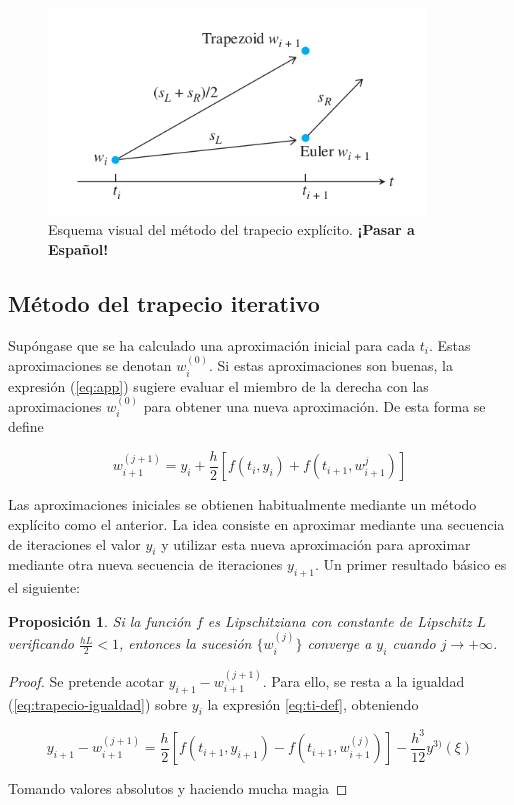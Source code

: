 \documentclass{article}
\theoremstyle{theorem-style}  %
\newtheorem{proposition}[theorem]{Proposición}
\theoremstyle{definition}
\theoremstyle{example-style}
\begin{document}
		\begin{figure}[H]
			\centering
			\includegraphics[width=10cm]{./Images/trapecio-vs-euler.png}
			\caption{Esquema visual del método del trapecio explícito. \textbf{¡Pasar a Español!}} 
			\label{fig:trapecio-vs-euler}
		\end{figure}

	\subsection{Método del trapecio iterativo}
	
		Supóngase que se ha calculado una aproximación inicial para cada $t_i$. Estas aproximaciones se denotan $w_i^{(0)}$. Si estas aproximaciones son buenas, la expresión (\ref{eq:app}) sugiere evaluar el miembro de la derecha con las aproximaciones $w_i^{(0)}$ para obtener una nueva aproximación. De esta forma se define
		
		\begin{equation} \label{eq:ti-def}
			w_{i+1} ^{(j+1)} = y_i + \frac{h}{2} \left[f(t_i, y_i) + f(t_{i+1}, w_{i+1}^{j})\right]
		\end{equation}

		Las aproximaciones iniciales se obtienen habitualmente mediante un método explícito como el anterior. La idea consiste en aproximar mediante una secuencia de iteraciones el valor $y_i$ y utilizar esta nueva aproximación para aproximar mediante otra nueva secuencia de iteraciones $y_{i+1}$. Un primer resultado básico es el siguiente:
		
		\begin{proposition}
			Si la función $f$ es Lipschitziana con constante de Lipschitz $L$ verificando $\frac{hL}{2} < 1$, entonces la sucesión $\{w_i^{(j)}\}$ converge a $y_i$ cuando $j \rightarrow +\infty$. 
		\end{proposition}

		\begin{proof}
			Se pretende acotar $y_{i+1} - w_{i+1}^{(j+1)}$. Para ello, se resta a la igualdad (\ref{eq:trapecio-igualdad}) sobre $y_i$ la expresión \ref{eq:ti-def}, obteniendo
			
			\begin{equation}
				y_{i+1} - w_{i+1}^{(j+1)} = \frac{h}{2} \left[f(t_{i+1},y_{i+1}) - f(t_{i+1}, w_{i+1}^{(j)})\right] - \frac{h^3}{12}y^{3)}(\xi)
			\end{equation}
			
			Tomando valores absolutos y haciendo mucha magia
		\end{proof}
\end{document}
